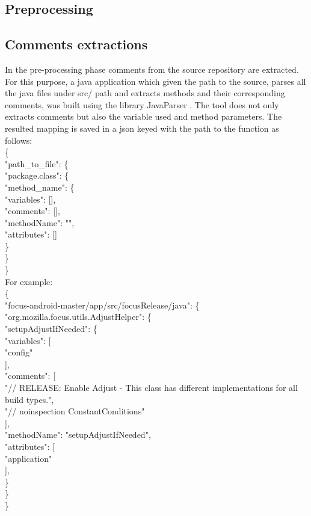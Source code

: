 \documentclass[sigconf]{acmart}
\begin{document}
\subsection{Preprocessing}
\subsection*{Comments extractions}
In the pre-processing phase comments from the source repository are extracted. For this purpose, a java application which given the path to the source, parses all the java files under src/ path and extracts methods and their corresponding comments, was built using the library JavaParser \cite{javaparser}. The tool does not only extracts comments but also the variable used and method parameters. The resulted mapping is saved in a json keyed with the path to the function as follows:\\
\{\\
\indent "path\_to\_file": \{\\
\indent\indent "package.class": \{\\
\indent\indent\indent"method\_name": \{\\
\indent\indent\indent\indent"variables": [],\\
\indent\indent\indent\indent"comments": [],\\
\indent\indent\indent\indent"methodName": "",\\
\indent\indent\indent\indent"attributes": []\\
\indent\indent\indent\}\\
\indent\indent\}\\
\}\\
For example:\\
\{\\
\indent "focus-android-master/app/src/focusRelease/java": \{\\
\indent\indent "org.mozilla.focus.utils.AdjustHelper": \{\\
\indent\indent\indent"setupAdjustIfNeeded": \{\\
\indent\indent\indent\indent"variables": [\\
\indent\indent\indent\indent\indent"config"\\
\indent\indent\indent\indent],\\
\indent\indent\indent\indent"comments": [\\
\indent\indent\indent\indent\indent"// RELEASE: Enable Adjust - This class has different implementations for all build types.",\\
\indent\indent\indent\indent\indent"// noinspection ConstantConditions"\\
\indent\indent\indent\indent],\\
\indent\indent\indent\indent"methodName": "setupAdjustIfNeeded",\\
\indent\indent\indent\indent"attributes": [\\
\indent\indent\indent\indent\indent"application"\\
\indent\indent\indent\indent],\\
\indent\indent\indent\}\\
\indent\indent\}\\
\}\\
\end{document}
